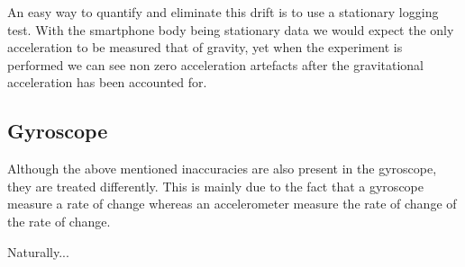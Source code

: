 An easy way to quantify and eliminate this drift is to use a stationary logging test. With the smartphone body being stationary data we would expect the only acceleration to be measured that of gravity, yet when the experiment is performed we can see non zero acceleration artefacts after the gravitational acceleration has been accounted for.

\subsection*{Gyroscope}
Although the above mentioned inaccuracies are also present in the gyroscope, they are treated differently. This is mainly due to the fact that a gyroscope measure a rate of change whereas an accelerometer measure the rate of change of the rate of change. 

Naturally... 